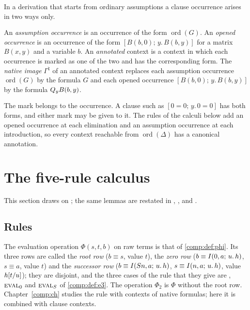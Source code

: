 In a derivation that starts from ordinary assumptions a clause occurrence
arises in two ways only.

\begin{definition}[Origins]
\label{claus:def:origin}
An \emph{assumption occurrence} is an occurrence of the form
$\operatorname{ord}(G)$. An \emph{opened occurrence} is an occurrence of the
form $[B(b,0);\,y.\,B(b,y)]$ for a matrix $B(x,y)$ and a variable $b$. An
\emph{annotated} context is a context in which each occurrence is marked as
one of the two and has the corresponding form. The \emph{native image}
$\Gamma^{\natural}$ of an annotated context replaces each assumption
occurrence $\operatorname{ord}(G)$ by the formula $G$ and each opened
occurrence $[B(b,0);\,y.\,B(b,y)]$ by the formula $Q_{y}B(b,y)$.
\end{definition}

The mark belongs to the occurrence. A clause such as $[0=0;\,y.\,0=0]$ has
both forms, and either mark may be given to it. The rules of the calculi
below add an opened occurrence at each elimination and an assumption
occurrence at each introduction, so every context reachable from
$\operatorname{ord}(\Delta)$ has a canonical annotation.

\section{The five-rule calculus}
\label{claus:sec:five}

This section draws on ; the same lemmas are restated in
, ,
 and .

\subsection{Rules}

The evaluation operation $\Phi(s,t,b)$ on raw terms is that of
\cref{comp:def:phi}. Its three rows are called the \emph{root row}
($b\equiv s$, value $t$), the \emph{zero row} ($b\equiv I(0,a;\,u.\,h)$,
$s\equiv a$, value $t$) and the \emph{successor row}
($b\equiv I(S n,a;\,u.\,h)$, $s\equiv I(n,a;\,u.\,h)$, value
$h[t/u]$); they are disjoint, and the three cases of the rule
 that they give are , $\rulename{Eval}_0$ and
$\rulename{Eval}_{\Suc}$ of \cref{comp:def:e3}. The operation $\Phi_2$ is
$\Phi$ without the root row. Chapter~\ref{comp:ch} studies the rule with
contexts of native formulas; here it is combined with clause contexts.

